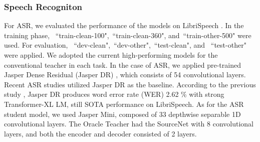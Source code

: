 \documentclass[journal]{IEEEtran}
\begin{document}
\subsubsection{Speech Recogniton}
For ASR, we evaluated the performance of the models on LibriSpeech \cite{librispeech:scheme}. In the training phase, ~``train-clean-100",~``train-clean-360", and~``train-other-500" were used. For evaluation, ~``dev-clean",~``dev-other",~``test-clean", and ~``test-other" were applied. 
We adopted the current high-performing models for the conventional teacher in each task. In the case of ASR, we applied pre-trained Jasper Dense Residual (Jasper DR) \cite{jasper:scheme}, which consists of 54 convolutional layers.
Recent ASR studies \cite{tutornet:scheme, asr1, asr2, asr3} utilized Jasper DR as the baseline.
According to the previous study \cite{jasper:scheme}, Jasper DR produces word error rate (WER) 2.62 \% with strong Transformer-XL \cite{transformer-xl} LM, still SOTA performance on LibriSpeech.
As for the ASR student model, we used Jasper Mini, composed of 33 depthwise separable 1D convolutional layers.
The Oracle Teacher had the SourceNet with 8 convolutional layers, and both the encoder and decoder consisted of 2 layers.
\end{document}
